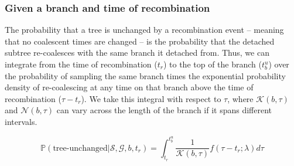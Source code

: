 \documentclass[11pt]{article}
\begin{document}
\subsubsection{Given a branch and time of recombination}

The probability that a tree is unchanged by a recombination event -- meaning that 
no coalescent times are changed -- is the probability that the detached subtree 
re-coalesces with the same branch it detached from. Thus, we can integrate 
from the time of recombination ($t_r$) to the top of the branch ($t_b^u$) over the 
probability of sampling the same branch times the exponential probability density
of re-coalescing at any time on that branch above the time of recombination 
($\tau - t_r$). We take this integral with respect to $\tau$, where 
$\mathcal{K}(b,\tau)$ and $\mathcal{N}(b,\tau)$
can vary across the length of the branch if it spans different intervals.





\begin{equation}
	\mathbb{P}(\textrm{tree-unchanged} | \mathcal{S}, \mathcal{G}, b, t_r) = 
	\int_{t_r}^{t_b^u} \frac{1}{\mathcal{K}(b,\tau)} f(\tau - t_r; \lambda) d\tau
\end{equation}
\end{document}
